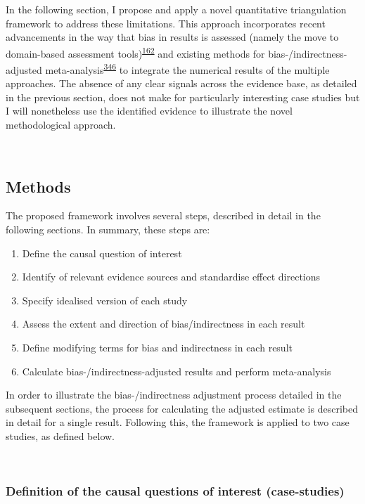 \documentclass[a4paper, twoside]{templates/ociamthesis}
\providecommand{\tightlist}{%
  \setlength{\itemsep}{0pt}\setlength{\parskip}{0pt}}
\begin{document}
In the following section, I propose and apply a novel quantitative triangulation framework to address these limitations. This approach incorporates recent advancements in the way that bias in results is assessed (namely the move to domain-based assessment tools)\textsuperscript{\protect\hyperlink{ref-sterne2019}{162}} and existing methods for bias-/indirectness-adjusted meta-analysis\textsuperscript{\protect\hyperlink{ref-turner2009}{346}} to integrate the numerical results of the multiple approaches. The absence of any clear signals across the evidence base, as detailed in the previous section, does not make for particularly interesting case studies but I will nonetheless use the identified evidence to illustrate the novel methodological approach.

~

\hypertarget{methods-3}{%
\subsection{Methods}\label{methods-3}}

The proposed framework involves several steps, described in detail in the following sections. In summary, these steps are:

\begin{enumerate}
\def\labelenumi{\arabic{enumi}.}
\tightlist
\item
  Define the causal question of interest
\item
  Identify of relevant evidence sources and standardise effect directions
\item
  Specify idealised version of each study
\item
  Assess the extent and direction of bias/indirectness in each result
\item
  Define modifying terms for bias and indirectness in each result
\item
  Calculate bias-/indirectness-adjusted results and perform meta-analysis
\end{enumerate}

In order to illustrate the bias-/indirectness adjustment process detailed in the subsequent sections, the process for calculating the adjusted estimate is described in detail for a single result. Following this, the framework is applied to two case studies, as defined below.

~

\hypertarget{definition-of-the-causal-questions-of-interest-case-studies}{%
\subsubsection{Definition of the causal questions of interest (case-studies)}\label{definition-of-the-causal-questions-of-interest-case-studies}}
\end{document}
